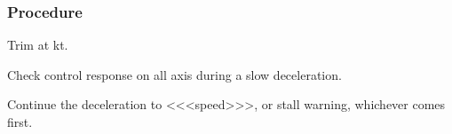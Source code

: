 % 
% 
%
 \subsubsection*{Procedure}
 \begin{compactenum}
   \item Trim at \theTrimSpeed{} kt.
   \item  Check control response on all axis during a slow deceleration.
   \item Continue the deceleration to <<<speed>>>, or stall warning, whichever comes first.
   \end{compactenum}